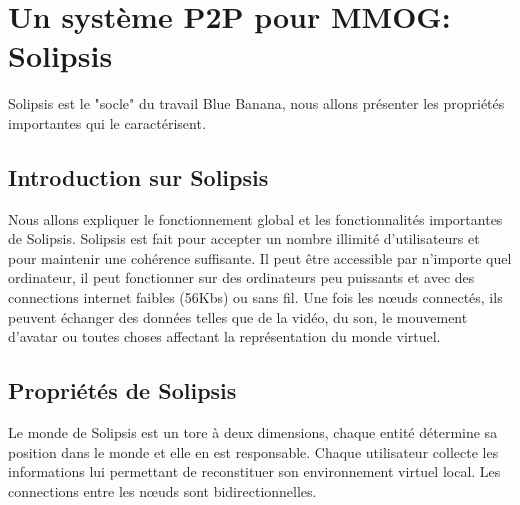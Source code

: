 \section{Un système P2P pour MMOG: Solipsis}
	\label{solipsis}
	Solipsis est le "socle" du travail Blue Banana, nous allons présenter les propriétés importantes qui le caractérisent.
	\subsection{Introduction sur Solipsis} 
	\par Nous allons expliquer le fonctionnement global et les fonctionnalités importantes de Solipsis. Solipsis est fait pour accepter un nombre illimité d'utilisateurs et pour maintenir une cohérence suffisante. Il peut être accessible par n'importe quel ordinateur, il peut fonctionner sur des ordinateurs peu puissants et avec des connections internet faibles (56Kbs) ou sans fil. Une fois les nœuds connectés, ils peuvent échanger des données telles que de la vidéo, du son, le mouvement d'avatar ou toutes choses affectant la représentation du monde virtuel. \\
	\subsection{Propriétés de Solipsis}
	Le monde de Solipsis est un tore à deux dimensions, chaque entité détermine sa position dans le monde et elle en est responsable. Chaque utilisateur collecte les informations lui permettant de reconstituer son environnement virtuel local. Les connections entre les nœuds sont bidirectionnelles. 
